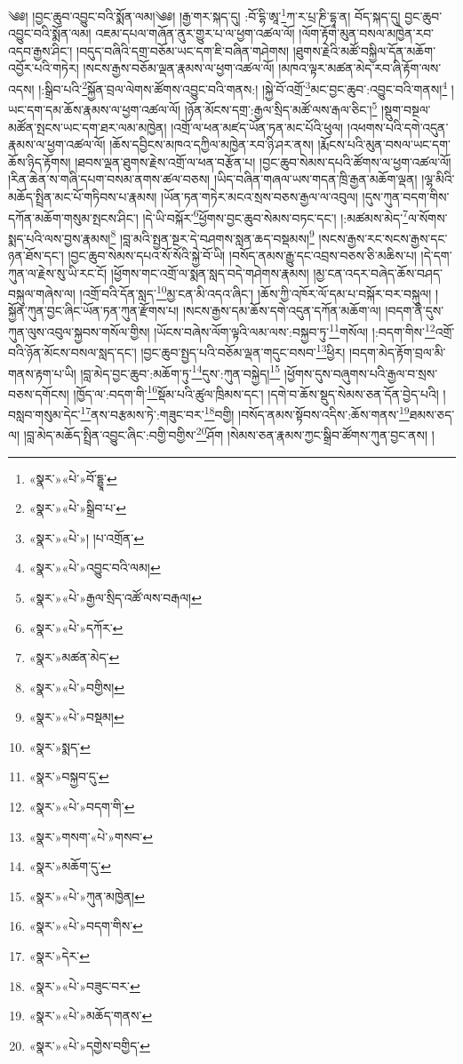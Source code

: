 ༄༅། །བྱང་ཆུབ་འབྱུང་བའི་སྨོན་ལམ།༄༅། །རྒྱ་གར་སྐད་དུ། :བོ་དྷི་ཨཱ་\footnote{«སྣར་»«པེ་»བོ་དྷྱཱ་}ཀ་ར་པྲ་ཎི་དྷཱ་ན། བོད་སྐད་དུ། བྱང་ཆུབ་འབྱུང་བའི་སྨོན་ལམ། འཇམ་དཔལ་གཞོན་ནུར་གྱུར་པ་ལ་ཕྱག་འཚལ་ལོ། །ལོག་རྟོག་མུན་བསལ་མཁྱེན་རབ་འདབ་རྒྱས་ཤིང་། །བདུད་བཞིའི་དགྲ་བཅོམ་ཡང་དག་ཇི་བཞིན་གཤེགས། །ཐུགས་རྗེའི་མཚོ་བསྐྱིལ་དོན་མཆོག་འབྱོར་པའི་གཏེར། །སངས་རྒྱས་བཅོམ་ལྡན་རྣམས་ལ་ཕྱག་འཚལ་ལོ། །མཁའ་ལྟར་མཚན་མེད་རབ་ཞི་རྟོག་ལས་འདས། །:སྒྲིབ་པའི་\footnote{«སྣར་»«པེ་»སྒྲིབ་པ་}སྐྱོན་བྲལ་ལེགས་ཚོགས་འབྱུང་བའི་གནས:། །སྐྱེ་བོ་འགྲོ་\footnote{«སྣར་»«པེ་»། །པ་འགྲོན་}མང་བྱང་ཆུབ་:འབྱུང་བའི་གནས།\footnote{«སྣར་»«པེ་»འབྱུང་བའི་ལམ།} །ཡང་དག་དམ་ཆོས་རྣམས་ལ་ཕྱག་འཚལ་ལོ། །ཉོན་མོངས་དགྲ་:རྒྱལ་སྲིད་མཚོ་ལས་རྒལ་ཅིང་།\footnote{«སྣར་»«པེ་»རྒྱལ་སྲིད་འཚོ་ལས་བརྒལ།} །སྡུག་བསྔལ་མཚོན་སྤངས་ཡང་དག་ཐར་ལམ་མཁྱེན། །འགྲོ་ལ་ཕན་མཛད་ཡོན་ཏན་མང་པོའི་ཕུལ། །འཕགས་པའི་དགེ་འདུན་རྣམས་ལ་ཕྱག་འཚལ་ལོ། །ཆོས་དབྱིངས་མཁའ་དཀྱིལ་མཁྱེན་རབ་ཉི་ཤར་ནས། །རྨོངས་པའི་མུན་བསལ་ཡང་དག་ཆོས་ཉིད་རྟོགས། །ཐབས་ལྡན་ཐུགས་རྗེས་འགྲོ་ལ་ཕན་བརྩོན་པ། །བྱང་ཆུབ་སེམས་དཔའི་ཚོགས་ལ་ཕྱག་འཚལ་ལོ། །རིན་ཆེན་ས་གཞི་དཔག་བསམ་ནགས་ཚལ་བཅས། །ཡིད་བཞིན་གཞལ་ཡས་གདན་ཁྲི་རྒྱན་མཆོག་ལྡན། །ལྷ་མིའི་མཆོད་སྤྲིན་མང་པོ་གཏིབས་པ་རྣམས། །ཡོན་ཏན་གཏེར་མངའ་སྲས་བཅས་རྒྱལ་ལ་འབུལ། །དུས་ཀུན་བདག་གིས་དཀོན་མཆོག་གསུམ་སྤངས་ཤིང་། །དེ་ཡི་བསྐོར་\footnote{«སྣར་»«པེ་»དཀོར་}ཕྱོགས་བྱང་ཆུབ་སེམས་བཏང་དང་། །:མཚམས་མེད་\footnote{«སྣར་»མཚན་མེད་}ལ་སོགས་སྨད་པའི་ལས་བྱས་རྣམས།\footnote{«སྣར་»«པེ་»བགྱིས།} །བླ་མའི་སྤྱན་སྔར་དེ་བཤགས་སླན་ཆད་བསྡམས།\footnote{«སྣར་»«པེ་»བསྡམ།} །སངས་རྒྱས་རང་སངས་རྒྱས་དང་ཉན་ཐོས་དང་། །བྱང་ཆུབ་སེམས་དཔའ་སོ་སོའི་སྐྱེ་བོ་ཡི། །བསོད་ནམས་རྒྱུ་དང་འབྲས་བཅས་ཅི་མཆིས་པ། །དེ་དག་ཀུན་ལ་རྗེས་སུ་ཡི་རང་ངོ། །ཕྱོགས་གང་འགྲོ་ལ་སྨན་སླད་བདེ་གཤེགས་རྣམས། །མྱ་ངན་འདར་བཞེད་ཆོས་བཤད་བསྐུལ་གཞེས་ལ། །འགྲོ་བའི་དོན་སླད་\footnote{«སྣར་»སྨད་}མྱ་ངན་མི་འདའ་ཞིང་། །ཆོས་ཀྱི་འཁོར་ལོ་དམ་པ་བསྐོར་བར་བསྐུལ། །སྐྱོན་ཀུན་བྱང་ཞིང་ཡོན་ཏན་ཀུན་རྫོགས་པ། །སངས་རྒྱས་དམ་ཆོས་དགེ་འདུན་དཀོན་མཆོག་ལ། །བདག་ནི་དུས་ཀུན་ལུས་འབུལ་སྐྱབས་གསོལ་གྱིས། །ཡོངས་བཞེས་ལོག་ལྟའི་ལམ་ལས་:བསྐྱབ་ཏུ་\footnote{«སྣར་»བསྐྱབ་དུ་}གསོལ། །:བདག་གིས་\footnote{«སྣར་»«པེ་»བདག་གི་}འགྲོ་བའི་ཉོན་མོངས་བསལ་སླད་དང་། །བྱང་ཆུབ་སྤྱད་པའི་བཅོམ་ལྡན་གདུང་བསབ་\footnote{«སྣར་»གསག་«པེ་»གསབ་}ཕྱིར། །བདག་མེད་རྟོག་བྲལ་མི་གནས་རྟག་པ་ཡི། །བླ་མེད་བྱང་ཆུབ་:མཆོག་ཏུ་\footnote{«སྣར་»མཆོག་དུ་}དུས་:ཀུན་བསྐྱེད།\footnote{«སྣར་»«པེ་»ཀུན་མཁྱེན།} །ཕྱོགས་དུས་བཞུགས་པའི་རྒྱལ་བ་སྲས་བཅས་དགོངས། །ཁྱོད་ལ་:བདག་གི་\footnote{«སྣར་»«པེ་»བདག་གིས་}སྡོམ་པའི་ཚུལ་ཁྲིམས་དང་། །དགེ་བ་ཆོས་སྡུད་སེམས་ཅན་དོན་བྱེད་པའི། །བསླབ་གསུམ་དེང་\footnote{«སྣར་»དེར་}ནས་བརྩམས་ཏེ་:གཟུང་བར་\footnote{«སྣར་»«པེ་»བཟུང་བར་}བགྱི། །བསོད་ནམས་སྟོབས་འདིས་:ཆོས་གནས་\footnote{«སྣར་»«པེ་»མཆོད་གནས་}ཐམས་ཅད་ལ། །བླ་མེད་མཆོད་སྤྲིན་འབྱུང་ཞིང་:བགྱི་བགྱིས་\footnote{«སྣར་»«པེ་»དགྱེས་བགྱིད་}ཤོག །སེམས་ཅན་རྣམས་ཀྱང་སྒྲིབ་ཚོགས་ཀུན་བྱང་ནས། །
